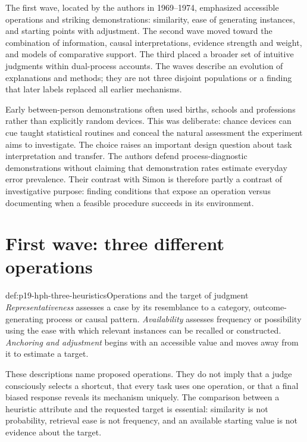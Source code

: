 The first wave, located by the authors in 1969--1974, emphasized accessible
operations and striking demonstrations: similarity, ease of generating
instances, and starting points with adjustment. The second wave moved
toward the combination of information, causal interpretations, evidence
strength and weight, and models of comparative support. The third placed
a broader set of intuitive judgments within dual-process accounts.
The waves describe an evolution of explanations and methods; they are
not three disjoint populations or a finding that later labels replaced
all earlier mechanisms.

Early between-person demonstrations often used births, schools and
professions rather than explicitly random devices. This was deliberate:
chance devices can cue taught statistical routines and conceal the
natural assessment the experiment aims to investigate. The choice raises
an important design question about task interpretation and transfer.
The authors defend process-diagnostic demonstrations without claiming
that demonstration rates estimate everyday error prevalence. Their
contrast with Simon is therefore partly a contrast of investigative
purpose: finding conditions that expose an operation versus documenting
when a feasible procedure succeeds in its environment.

\section{First wave: three different operations}
\label{sec:p19-hph-first-wave}

\begin{hbdefinition}{def:p19-hph-three-heuristics}{Operations and the target of judgment}
\emph{Representativeness} assesses a case by its resemblance to a category,
outcome-generating process or causal pattern. \emph{Availability} assesses
frequency or possibility using the ease with which relevant instances
can be recalled or constructed. \emph{Anchoring and adjustment} begins
with an accessible value and moves away from it to estimate a target.

These descriptions name proposed operations. They do not imply that a
judge consciously selects a shortcut, that every task uses one operation,
or that a final biased response reveals its mechanism uniquely. The
comparison between a heuristic attribute and the requested target is
essential: similarity is not probability, retrieval ease is not frequency,
and an available starting value is not evidence about the target.
\end{hbdefinition}

